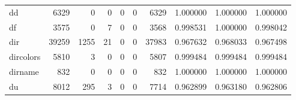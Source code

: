 \begin{longtable}{lrrrrrrrrr}
dd        &                                6329 &                                               0 &                                              0 &                                             0 &                                              0 &                                         6329 &                                           1.000000 &                               1.000000 &                             1.000000 \\
df        &                                3575 &                                               0 &                                              7 &                                             0 &                                              0 &                                         3568 &                                           0.998531 &                               1.000000 &                             0.998042 \\
dir       &                               39259 &                                            1255 &                                             21 &                                             0 &                                              0 &                                        37983 &                                           0.967632 &                               0.968033 &                             0.967498 \\
dircolors &                                5810 &                                               3 &                                              0 &                                             0 &                                              0 &                                         5807 &                                           0.999484 &                               0.999484 &                             0.999484 \\
dirname   &                                 832 &                                               0 &                                              0 &                                             0 &                                              0 &                                          832 &                                           1.000000 &                               1.000000 &                             1.000000 \\
du        &                                8012 &                                             295 &                                              3 &                                             0 &                                              0 &                                         7714 &                                           0.962899 &                               0.963180 &                             0.962806 \\

\end{longtable}
